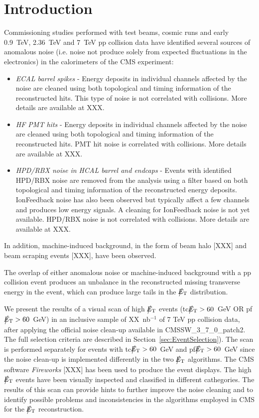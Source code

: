 \section{Introduction}

Commissioning studies performed with test beams, cosmic runs and 
early 0.9~TeV, 2.36~TeV and 7~TeV pp 
collision data have identified several sources of anomalous noise 
(i.e. noise not produce solely from expected fluctuations in the electronics)
in the calorimeters of the CMS experiment:
\begin{itemize}
\item {\it ECAL barrel spikes} - Energy deposits in individual channels 
affected by the noise are cleaned using both topological and 
timing information of the reconstructed hits. This type of noise is not correlated with collisions. 
More details are available at XXX.
\item {\it HF PMT hits} - Energy deposits in individual channels 
affected by the noise are cleaned using both topological and 
timing information of the reconstructed hits. PMT hit noise is correlated with collisions. 
More details are available at XXX.
\item {\it HPD/RBX noise in HCAL barrel and endcaps} - Events with identified 
HPD/RBX noise are removed from the analysis using a filter based on both topological 
and timing information of the reconstructed energy deposits. IonFeedback noise has also been observed 
but typically affect a few channels and produces low energy signals. A cleaning for IonFeedback noise 
is not yet available. HPD/RBX noise is not correlated with collisions. More details are available at XXX.
\end{itemize}
In addition, machine-induced background, in the form of 
beam halo [XXX] and beam scraping events [XXX], have been observed. 

The overlap of either anomalous noise or machine-induced background 
with a pp collision event produces an unbalance in 
the reconstructed missing transverse energy in the event, which can produce 
large tails in the $\big\slash\hspace{-1.6ex}{E_\text{T}}$ distribution. 

We present the results of a visual scan of high $\big\slash\hspace{-1.6ex}{E_\text{T}}$ events 
(tc$\big\slash\hspace{-1.6ex}{E_\text{T}}>60$~GeV OR pf$\big\slash\hspace{-1.6ex}{E_\text{T}}>60$~GeV)
in an inclusive sample of XX~nb$^{-1}$ of 7 TeV pp collision data, 
after applying the official noise clean-up available in CMSSW\_3\_7\_0\_patch2.
The full selection criteria are described in Section~\ref{sec:EventSelection}). 
The scan is performed separately for events with tc$\big\slash\hspace{-1.6ex}{E_\text{T}}>60$~GeV and pf$\big\slash\hspace{-1.6ex}{E_\text{T}}>60$~GeV
since the noise clean-up is implemented differently in the two $\big\slash\hspace{-1.6ex}{E_\text{T}}$ algorithms.
The CMS software {\it Fireworks} [XXX] has been used to produce the event displays. 
The high $\big\slash\hspace{-1.6ex}{E_\text{T}}$ events have been visually inspected and classified in different 
cathegories. The results of this scan can provide hints to further improve the noise 
cleaning and to identify possible problems and inconsistencies in the algorithms employed 
in CMS for the $\big\slash\hspace{-1.6ex}{E_\text{T}}$ reconstruction.

